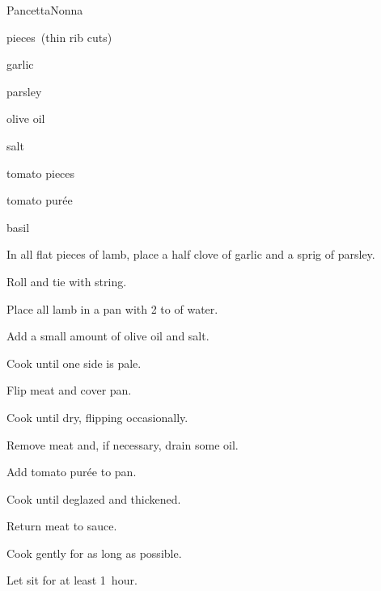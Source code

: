 \begin{recipe}{Pancetta}{Nonna}{}

\begin{ingredients}
\item {} pieces~(thin rib cuts)
\item garlic
\item parsley
\item olive oil
\item salt
\item tomato pieces
\item tomato pur\'ee
\item basil
\end{ingredients}

\begin{directions}
\item In all flat pieces of lamb, place a half clove of garlic and a sprig of parsley.
\item Roll and tie with string.
\item Place all lamb in a pan with 2 to  of water.
\item Add a small amount of olive oil and salt.
\item Cook until one side is pale.
\item Flip meat and cover pan.
\item Cook until dry, flipping occasionally.
\item Remove meat and, if necessary, drain some oil.
\item Add tomato pur\'ee to pan.
\item Cook until deglazed and thickened.
\item Return meat to sauce.
\item Cook gently for as long as possible.
\item Let sit for at least 1~hour.
\end{directions}

\end{recipe}

